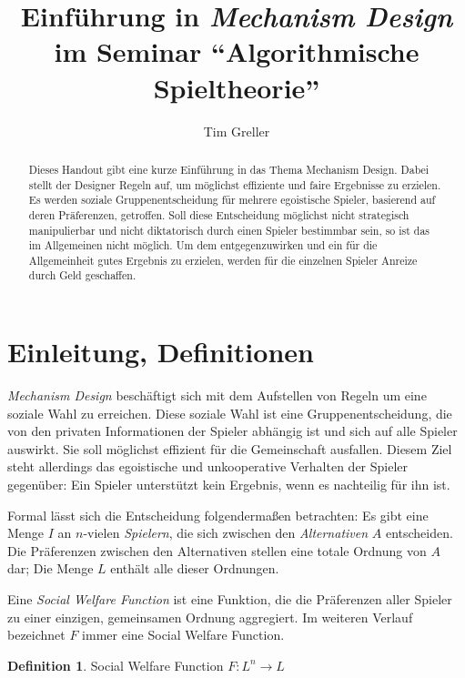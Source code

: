 \documentclass[a4paper,11pt]{article}
\title{Einführung in \textit{Mechanism Design} \\ \Large im Seminar ``Algorithmische Spieltheorie''}
\author{Tim Greller}
\theoremstyle{definition}
\newtheorem{definition}{Definition}
\theoremstyle{plain}
\theoremstyle{definition}
\begin{document}
\maketitle

\begin{abstract}
	Dieses Handout gibt eine kurze Einführung in das Thema Mechanism Design. Dabei stellt der Designer Regeln auf, um möglichst effiziente und faire Ergebnisse zu erzielen. Es werden soziale Gruppenentscheidung für mehrere egoistische Spieler, basierend auf deren Präferenzen, getroffen. Soll diese Entscheidung möglichst nicht strategisch manipulierbar und nicht diktatorisch durch einen Spieler bestimmbar sein, so ist das im Allgemeinen nicht möglich. Um dem entgegenzuwirken und ein für die Allgemeinheit gutes Ergebnis zu erzielen, werden für die einzelnen Spieler Anreize durch Geld geschaffen.
\end{abstract}

\setcounter{page}{0}
\fancyhead{}
\fancyhead[ER]{\leftmark}
\fancyhead[OL]{\rightmark}
\fancyhead[EL,OR]{\thepage}
\pagestyle{fancy}


\section{Einleitung, Definitionen}
\emph{Mechanism Design} beschäftigt sich mit dem Aufstellen von Regeln um eine soziale Wahl zu erreichen. Diese soziale Wahl ist eine Gruppenentscheidung, die von den privaten Informationen der Spieler abhängig ist und sich auf alle Spieler auswirkt. Sie soll möglichst effizient für die Gemeinschaft ausfallen. Diesem Ziel steht allerdings das egoistische und unkooperative Verhalten der Spieler gegenüber: Ein Spieler unterstützt kein Ergebnis, wenn es nachteilig für ihn ist.~\cite{ste08}

Formal lässt sich die Entscheidung folgendermaßen betrachten:
Es gibt eine Menge $I$ an $n$-vielen \emph{Spielern}, die sich zwischen den \emph{Alternativen} $A$ entscheiden. Die Präferenzen zwischen den Alternativen stellen eine totale Ordnung von $A$ dar; Die Menge $L$ enthält alle dieser Ordnungen.~\cite{nis07}

Eine \emph{Social Welfare Function} ist eine Funktion, die die Präferenzen aller Spieler zu einer einzigen, gemeinsamen Ordnung aggregiert. Im weiteren Verlauf bezeichnet $F$ immer eine Social Welfare Function.
\begin{definition}
	\label{def:socialwelfarefunc}
	Social Welfare Function $F : L^n \rightarrow L$
\end{definition}
\end{document}
